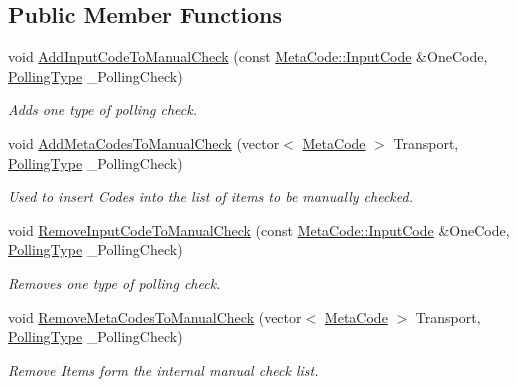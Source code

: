 \subsection*{Public Member Functions}
\begin{DoxyCompactItemize}
\item 
void \hyperlink{structphys_1_1internal_1_1EventManagerInternalData_a2cf843f8829114491b13b3253a27b627}{AddInputCodeToManualCheck} (const \hyperlink{classphys_1_1MetaCode_a3e501cbb5bf0f6f1fdb7211465bda8d8}{MetaCode::InputCode} \&OneCode, \hyperlink{structphys_1_1internal_1_1EventManagerInternalData_ab9ab8380b84448aacf46a63050e159af}{PollingType} \_\-PollingCheck)
\begin{DoxyCompactList}\small\item\em Adds one type of polling check. \item\end{DoxyCompactList}\item 
void \hyperlink{structphys_1_1internal_1_1EventManagerInternalData_ac2e4044e2fc6eb2df18a3e274c175065}{AddMetaCodesToManualCheck} (vector$<$ \hyperlink{classphys_1_1MetaCode}{MetaCode} $>$ Transport, \hyperlink{structphys_1_1internal_1_1EventManagerInternalData_ab9ab8380b84448aacf46a63050e159af}{PollingType} \_\-PollingCheck)
\begin{DoxyCompactList}\small\item\em Used to insert Codes into the list of items to be manually checked. \item\end{DoxyCompactList}\item 
void \hyperlink{structphys_1_1internal_1_1EventManagerInternalData_aadc9e786da13f2c669fc7e054d8fbf37}{RemoveInputCodeToManualCheck} (const \hyperlink{classphys_1_1MetaCode_a3e501cbb5bf0f6f1fdb7211465bda8d8}{MetaCode::InputCode} \&OneCode, \hyperlink{structphys_1_1internal_1_1EventManagerInternalData_ab9ab8380b84448aacf46a63050e159af}{PollingType} \_\-PollingCheck)
\begin{DoxyCompactList}\small\item\em Removes one type of polling check. \item\end{DoxyCompactList}\item 
void \hyperlink{structphys_1_1internal_1_1EventManagerInternalData_a54babcae1822814f09beace684f97e72}{RemoveMetaCodesToManualCheck} (vector$<$ \hyperlink{classphys_1_1MetaCode}{MetaCode} $>$ Transport, \hyperlink{structphys_1_1internal_1_1EventManagerInternalData_ab9ab8380b84448aacf46a63050e159af}{PollingType} \_\-PollingCheck)
\begin{DoxyCompactList}\small\item\em Remove Items form the internal manual check list. \item\end{DoxyCompactList}\end{DoxyCompactItemize}
